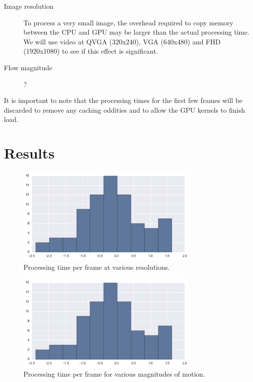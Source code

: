 \documentclass[12pt,letterpaper]{article}
\begin{document}
\begin{description}
  \item[Image resolution] To process a very small image, the overhead required
    to copy memory between the CPU and GPU may be larger than the actual
    processing time. We will use video at QVGA (320x240), VGA (640x480) and FHD
    (1920x1080) to see if this effect is significant.
  \item[Flow magnitude] ?
\end{description}

It is important to note that the processing times for the first few frames will
be discarded to remove any caching oddities and to allow the GPU kernels to
finish load.

\section{Results}

\begin{figure}[H]
  \centering
    \includegraphics[width=0.8\textwidth]{test_resolution.png}
  \caption{Processing time per frame at various resolutions.}
\end{figure}

\begin{figure}[H]
  \centering
    \includegraphics[width=0.8\textwidth]{test_flow.png}
  \caption{Processing time per frame for various magnitudes of motion.}
\end{figure}
\end{document}

